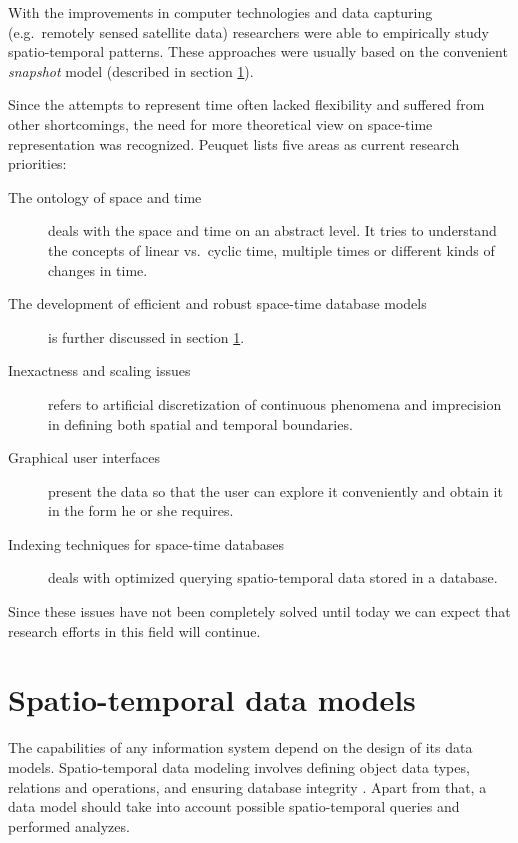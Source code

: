 \documentclass[a4paper,12pt,oneside]{book}
\begin{document}
With the improvements in computer technologies and data capturing
(e.g.\ remotely sensed satellite data) researchers were able to empirically
study spatio-temporal patterns. These approaches were usually based on the
convenient \emph{snapshot} model (described in section \ref{sec:stModels}).

Since the attempts to represent time often lacked flexibility and suffered from other shortcomings,
the need for more theoretical view on space-time representation was recognized.
Peuquet \cite{peuquet2001} lists five areas as current research priorities:
    \begin{description}
      \item[The ontology of space and time]
      deals with the space and time on an abstract level. It tries to understand
      the concepts of linear vs.\ cyclic time, multiple times or different kinds of changes in time.
      
      \item[The development of efficient and robust space-time database models]
      is \newline further discussed in section \ref{sec:stModels}.
      \item[Inexactness and scaling issues] refers to artificial discretization
      of continuous phenomena and imprecision in defining both spatial and temporal boundaries.
      \item[Graphical user interfaces]
      present the data so that the user can explore it conveniently and obtain it in the form he or she requires.
      \item[Indexing techniques for space-time databases] deals with optimized
      querying spatio-temporal data stored in a database.
     \end{description}

Since these issues have not been completely solved until today we can expect that research efforts
in this field will continue.

\section{Spatio-temporal data models}
\label{sec:stModels}
The capabilities of any information system depend on the design of its data models.
Spatio-temporal data modeling involves defining object data types,
relations and operations, and ensuring database integrity \cite{pelekis2004}.
Apart from that, a data model should take into account possible spatio-temporal queries and performed analyzes.
\end{document}
